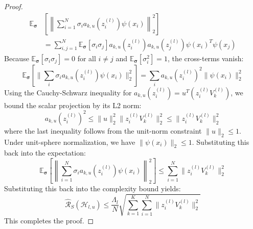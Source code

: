 \begin{proof}
\begin{align}
    \mathbb{E}_{\boldsymbol{\sigma}} &\left[ \left\| \sum_{i=1}^N \sigma_i a_{k, u}(z_i^{(l)}) \psi(x_i) \right\|_2^2 \right] \nonumber \\
    &= \sum_{i, j=1}^N \mathbb{E}_{\boldsymbol{\sigma}}[\sigma_i \sigma_j] a_{k, u}(z_i^{(l)}) a_{k, u}(z_j^{(l)}) \psi(x_i)^T \psi(x_j)
\end{align}
Because $\mathbb{E}_{\boldsymbol{\sigma}}[\sigma_i \sigma_j] = 0$ for all $i \neq j$ and $\mathbb{E}_{\boldsymbol{\sigma}}[\sigma_i^2] = 1$, the cross-terms vanish:
\begin{equation}
    \mathbb{E}_{\boldsymbol{\sigma}} [ \| \sum_i \sigma_i a_{k, u}(z_i^{(l)}) \psi(x_i) \|_2^2 ] = \sum_i a_{k, u}(z_i^{(l)})^2 \|\psi(x_i)\|_2^2
\end{equation}
Using the Cauchy-Schwarz inequality for $a_{k, u}(z_i^{(l)}) = u^T \left( z_i^{(l)} V_k^{(l)} \right)$, we bound the scalar projection by its L2 norm:
\begin{equation}
    a_{k, u}(z_i^{(l)})^2 \leq \|u\|_2^2 \|z_i^{(l)} V_k^{(l)}\|_2^2 \leq \|z_i^{(l)} V_k^{(l)}\|_2^2
\end{equation}
where the last inequality follows from the unit-norm constraint $\|u\|_2 \leq 1$. Under unit-sphere normalization, we have $\|\psi(x_i)\|_2 \leq 1$. Substituting this back into the expectation:
\begin{equation}
    \mathbb{E}_{\boldsymbol{\sigma}} \left[ \left\| \sum_{i=1}^N \sigma_i a_{k, u}(z_i^{(l)}) \psi(x_i) \right\|_2^2 \right] \leq \sum_{i=1}^N \|z_i^{(l)} V_k^{(l)}\|_2^2
\end{equation}
Substituting this back into the complexity bound yields:
\begin{equation}
    \hat{\mathcal{R}}_S(\mathcal{H}_{l, u}) \leq \frac{\Lambda_l}{N} \sqrt{ \sum_{k=1}^K \sum_{i=1}^N \|z_i^{(l)} V_k^{(l)}\|_2^2 }
\end{equation}
This completes the proof.
\end{proof}

